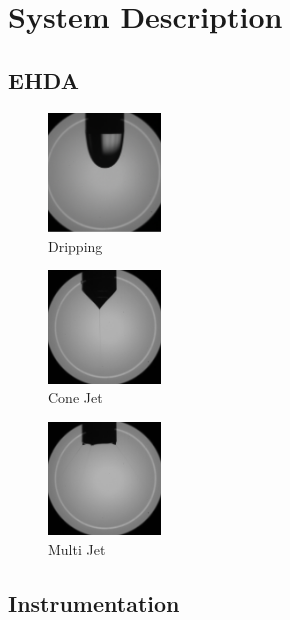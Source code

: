 \chapter[System Description]{System Description}
\label{chap:descricaoproblema}


\section{EHDA}
\label{sec:ehda_resume}


\begin{multicols}{3}

  \begin{figure}[H]
      \center
      \includegraphics[width=3cm]{Figuras/drippingexample.png}
      \caption{Dripping}
  \end{figure}


  \begin{figure}[H]
      \center
      \includegraphics[width=3cm]{Figuras/conejetexample.png}
      \caption{Cone Jet}
  \end{figure}


  \begin{figure}[H]
      \center
      \includegraphics[width=3cm]{Figuras/multijetexample.png}
      \caption{Multi Jet}
  \end{figure}

\end{multicols}


\section{Instrumentation}
\label{sec:instrumentation}

